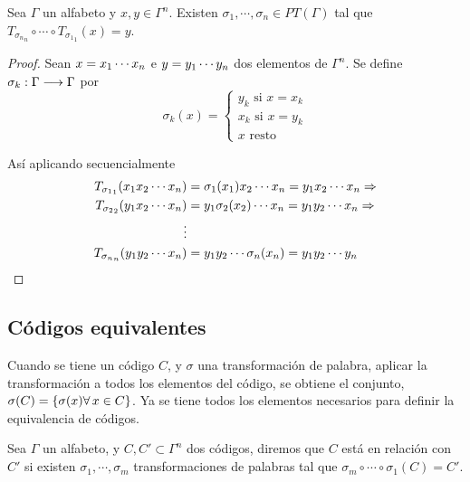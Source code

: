 \begin{lemma}
	\label{res:palabra-transforma-cero}
	Sea $\Gamma$ un alfabeto y $x,y\in\Gamma^n$.
	Existen $\sigma_1,\cdots,\sigma_n\in PT(\Gamma)$ tal que $T_{{\sigma_n}_n}\circ\cdots\circ T_{{\sigma_1}_1}(x)=y$.
\end{lemma}
\begin{proof}
	Sean $x=x_1\cdots x_{n}$ e  $y=y_1\cdots y_{n}$ dos elementos de $\Gamma^n$.
	Se define $\sigma_k:\Gamma\longrightarrow \Gamma$ por
	\[\sigma_k(x)=\begin{cases}
		              y_k \text{ si } x = x_k\\
		              x_k \text{ si } x = y_k\\
		              x \text{ resto }
	\end{cases}
	\]

	Así aplicando secuencialmente
	\begin{align*}
		T_{{\sigma_1}_1}(x_1 x_2\cdots x_n)&=\sigma_1(x_1)x_2\cdots x_n=y_1 x_2\cdots x_n\Rightarrow\\
		T_{{\sigma_2}_2}(y_1 x_2\cdots x_n)&=y_1\sigma_2(x_2)\cdots x_n=y_1 y_2\cdots x_n\Rightarrow\\
		\vdots & \\
		T_{{\sigma_n}_n}(y_1 y_2\cdots x_n)&=y_1 y_2\cdots\sigma_n(x_n)=y_1 y_2\cdots y_n
	\end{align*}
\end{proof}

\subsection{Códigos equivalentes}
Cuando se tiene un código $C$, y $\sigma$ una transformación de palabra, aplicar la transformación a todos los elementos del código, se obtiene el conjunto, $\sigma(C)=\set{\sigma(x) \forall x\in C}$.
Ya se tiene todos los elementos necesarios para definir la equivalencia de códigos.
\begin{definition}\label{def:codigo-equivalente}
	Sea $\Gamma$ un alfabeto, y $C,C'\subset \Gamma^n$ dos códigos, diremos que $C$ está en relación con $C'$ si existen $\sigma_1,\cdots,\sigma_m$ transformaciones de palabras tal que $\sigma_m\circ\cdots\circ \sigma_1(C)= C'$.
\end{definition}

